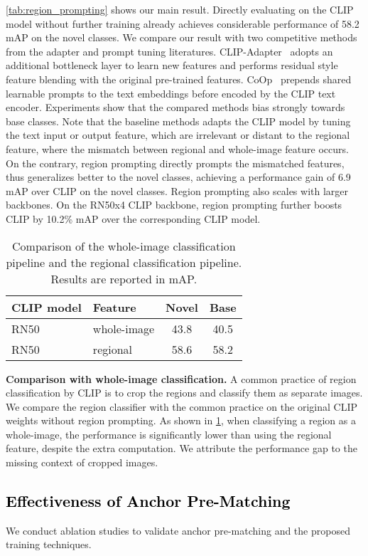 \documentclass[10pt,twocolumn,letterpaper]{article}
\begin{document}
\cref{tab:region_prompting} shows our main result.
Directly evaluating on the CLIP model without further training already achieves considerable performance of 58.2 mAP on the novel classes.
We compare our result with two competitive methods from the adapter and prompt tuning literatures.
CLIP-Adapter~\cite{clipadapter} adopts an additional bottleneck layer to learn new features and performs residual style feature blending with the original pre-trained features. 
CoOp~\cite{coop} prepends shared learnable prompts to the text embeddings before encoded by the CLIP text encoder.
Experiments show that the compared methods bias strongly towards base classes.
Note that the baseline methods adapts the CLIP model by tuning the text input or output feature, which are irrelevant or distant to the regional feature, where the mismatch between regional and whole-image feature occurs.
On the contrary, region prompting directly prompts the mismatched features, thus generalizes better to the novel classes, achieving a performance gain of 6.9 mAP over CLIP on the novel classes.
Region prompting also scales with larger backbones. 
On the RN50x4 CLIP backbone, region prompting further boosts CLIP by 10.2\% mAP over the corresponding CLIP model.

\begin{table}[]
\centering
\begin{tabular}{l|lcc}
\toprule
CLIP model       & Feature & Novel & Base                        \\
\midrule
RN50         & whole-image       & 43.8  & 40.5 \\
RN50 & regional       & 58.6  & 58.2 \\
\bottomrule
\end{tabular}
\caption{Comparison of the whole-image classification pipeline and the regional classification pipeline. Results are reported in mAP.}
\label{tab:whole_image}
\end{table} \noindent\textbf{Comparison with whole-image classification. }
A common practice of region classification by CLIP is to crop the regions and classify them as separate images.
We compare the region classifier with the common practice on the original CLIP weights without region prompting.
As shown in \cref{tab:whole_image}, when classifying a region as a whole-image, the performance is significantly lower than using the regional feature, despite the extra computation.
We attribute the performance gap to the missing context of cropped images.

\subsection{\textcolor{black}{Effectiveness of Anchor Pre-Matching}}
\label{sec:anchor_pre-matching}
We conduct ablation studies to validate anchor pre-matching and the proposed training techniques.
\end{document}

